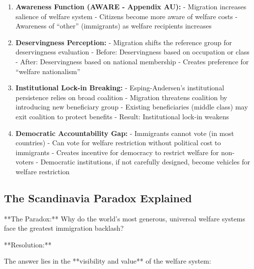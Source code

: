 \begin{enumerate}

\item \textbf{Awareness Function (AWARE - Appendix AU):}
   - Migration increases salience of welfare system
   - Citizens become more aware of welfare costs
   - Awareness of ``other'' (immigrants) as welfare recipients increases

\item \textbf{Deservingness Perception:}
   - Migration shifts the reference group for deservingness evaluation
   - Before: Deservingness based on occupation or class
   - After: Deservingness based on national membership
   - Creates preference for ``welfare nationalism''

\item \textbf{Institutional Lock-in Breaking:}
   - Esping-Andersen's institutional persistence relies on broad coalition
   - Migration threatens coalition by introducing new beneficiary group
   - Existing beneficiaries (middle class) may exit coalition to protect benefits
   - Result: Institutional lock-in weakens

\item \textbf{Democratic Accountability Gap:}
   - Immigrants cannot vote (in most countries)
   - Can vote for welfare restriction without political cost to immigrants
   - Creates incentive for democracy to restrict welfare for non-voters
   - Democratic institutions, if not carefully designed, become vehicles for welfare restriction

\end{enumerate}

\subsection{The Scandinavia Paradox Explained}

**The Paradox:** Why do the world's most generous, universal welfare systems face the greatest immigration backlash?

**Resolution:**

The answer lies in the **visibility and value** of the welfare system:

